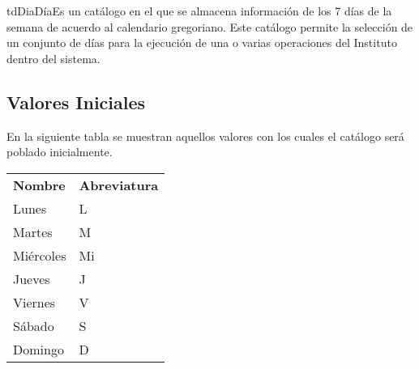 	\begin{TipoDeDato}{tdDia}{Día}{Es un catálogo en el que se almacena información de los 7 días de la semana de acuerdo al calendario gregoriano. Este catálogo permite la selección de un conjunto de días para la ejecución de una o varias operaciones del Instituto dentro del sistema.}
	\begin{tdAtributos}
	\end{tdAtributos}
	
	\subsection{Valores Iniciales}
	
	En la siguiente tabla se muestran aquellos valores con los cuales el catálogo será poblado inicialmente.\cdtEmpty
	 		\begin{longtable}{| p{}| p{}|}
	 			\rowcolor{colorPrincipal}
	 			\multicolumn{2}{|c|}{\bf \color{white}Valores Iniciales}\\
	 			\hline
	 			\rowcolor{colorSecundario}
	 			\bf \color{white} Nombre & \bf \color{white} Abreviatura \\
	 			\endhead
	 			\hline
	 			Lunes & L\\
	 			\hline
	 			Martes & M \\
	 			\hline
	 			Miércoles & Mi \\
	 			\hline
	 			Jueves & J\\ 
				\hline
				Viernes & V\\
				\hline
				Sábado & S\\
				\hline
				Domingo & D\\
				\hline
	 		\end{longtable}
	\end{TipoDeDato}
	
